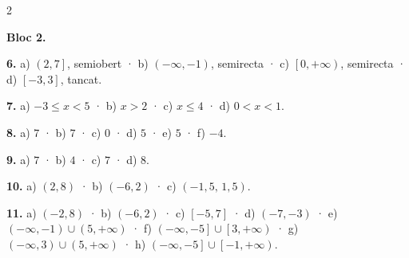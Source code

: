 \documentclass[13pt,a4paper]{extarticle}
\begin{document}
\begin{multicols}{2}
\begin{minipage}{\linewidth}
\textbf{Bloc 2.}\par
\end{minipage}\par\vspace{1.6mm}
\par\noindent\begin{minipage}{\linewidth}
\textbf{6.} a) $\left(2,7\right]$, semiobert · b) $\left(-\infty,-1\right)$, semirecta · c) $\left[0,+\infty\right)$, semirecta · d) $\left[-3,3\right]$, tancat.\par
\end{minipage}\par\vspace{1.6mm}
\par\noindent\begin{minipage}{\linewidth}
\textbf{7.} a) $-3\le x<5$ · b) $x>2$ · c) $x\le4$ · d) $0<x<1$.\par
\end{minipage}\par\vspace{1.6mm}
\par\noindent\begin{minipage}{\linewidth}
\textbf{8.} a) $7$ · b) $7$ · c) $0$ · d) $5$ · e) $5$ · f) $-4$.\par
\end{minipage}\par\vspace{1.6mm}
\par\noindent\begin{minipage}{\linewidth}
\textbf{9.} a) $7$ · b) $4$ · c) $7$ · d) $8$.\par
\end{minipage}\par\vspace{1.6mm}
\par\noindent\begin{minipage}{\linewidth}
\textbf{10.} a) $\left(2,8\right)$ · b) $\left(-6,2\right)$ · c) $\left(-1{,}5,\,1{,}5\right)$.\par
\end{minipage}\par\vspace{1.6mm}
\par\noindent\begin{minipage}{\linewidth}
\textbf{11.} a) $\left(-2,8\right)$ · b) $\left(-6,2\right)$ · c) $\left[-5,7\right]$ · d) $\left(-7,-3\right)$ · e) $\left(-\infty,-1\right)\cup\left(5,+\infty\right)$ · f) $\left(-\infty,-5\right]\cup\left[3,+\infty\right)$ · g) $\left(-\infty,3\right)\cup\left(5,+\infty\right)$ · h) $\left(-\infty,-5\right]\cup\left[-1,+\infty\right)$.\par

\end{minipage}
\end{multicols}
\end{document}
